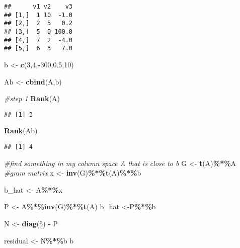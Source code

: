 \documentclass[
]{article}
\newenvironment{Shaded}{\begin{snugshade}}{\end{snugshade}}
\newcommand{\CommentTok}[1]{\textcolor[rgb]{0.56,0.35,0.01}{\textit{#1}}}
\newcommand{\DecValTok}[1]{\textcolor[rgb]{0.00,0.00,0.81}{#1}}
\newcommand{\FloatTok}[1]{\textcolor[rgb]{0.00,0.00,0.81}{#1}}
\newcommand{\FunctionTok}[1]{\textcolor[rgb]{0.13,0.29,0.53}{\textbf{#1}}}
\newcommand{\NormalTok}[1]{#1}
\newcommand{\OtherTok}[1]{\textcolor[rgb]{0.56,0.35,0.01}{#1}}
\newcommand{\SpecialCharTok}[1]{\textcolor[rgb]{0.81,0.36,0.00}{\textbf{#1}}}
\begin{document}
\begin{verbatim}
##      v1 v2    v3
## [1,]  1 10  -1.0
## [2,]  2  5   0.2
## [3,]  5  0 100.0
## [4,]  7  2  -4.0
## [5,]  6  3   7.0
\end{verbatim}

\begin{Shaded}
\begin{Highlighting}[]
\NormalTok{b }\OtherTok{\textless{}{-}} \FunctionTok{c}\NormalTok{(}\DecValTok{3}\NormalTok{,}\DecValTok{4}\NormalTok{,}\SpecialCharTok{{-}}\DecValTok{300}\NormalTok{,}\FloatTok{0.5}\NormalTok{,}\DecValTok{10}\NormalTok{)}

\NormalTok{Ab }\OtherTok{\textless{}{-}} \FunctionTok{cbind}\NormalTok{(A,b)}

\CommentTok{\#step 1}
\FunctionTok{Rank}\NormalTok{(A)}
\end{Highlighting}
\end{Shaded}

\begin{verbatim}
## [1] 3
\end{verbatim}

\begin{Shaded}
\begin{Highlighting}[]
\FunctionTok{Rank}\NormalTok{(Ab)}
\end{Highlighting}
\end{Shaded}

\begin{verbatim}
## [1] 4
\end{verbatim}

\begin{Shaded}
\begin{Highlighting}[]
\CommentTok{\#find something in my column space A that is close to b}
\NormalTok{G }\OtherTok{\textless{}{-}} \FunctionTok{t}\NormalTok{(A)}\SpecialCharTok{\%*\%}\NormalTok{A }\CommentTok{\#gram matrix}
\NormalTok{x }\OtherTok{\textless{}{-}} \FunctionTok{inv}\NormalTok{(G)}\SpecialCharTok{\%*\%}\FunctionTok{t}\NormalTok{(A)}\SpecialCharTok{\%*\%}\NormalTok{b}

\NormalTok{b\_hat }\OtherTok{\textless{}{-}}\NormalTok{ A}\SpecialCharTok{\%*\%}\NormalTok{x}


\NormalTok{P }\OtherTok{\textless{}{-}}\NormalTok{ A}\SpecialCharTok{\%*\%}\FunctionTok{inv}\NormalTok{(G)}\SpecialCharTok{\%*\%}\FunctionTok{t}\NormalTok{(A)}
\NormalTok{b\_hat }\OtherTok{\textless{}{-}}\NormalTok{P}\SpecialCharTok{\%*\%}\NormalTok{b}

\NormalTok{N }\OtherTok{\textless{}{-}} \FunctionTok{diag}\NormalTok{(}\DecValTok{5}\NormalTok{) }\SpecialCharTok{{-}}\NormalTok{ P}

\NormalTok{residual }\OtherTok{\textless{}{-}}\NormalTok{ N}\SpecialCharTok{\%*\%}\NormalTok{b}
\NormalTok{b}
\end{Highlighting}
\end{Shaded}
\end{document}

